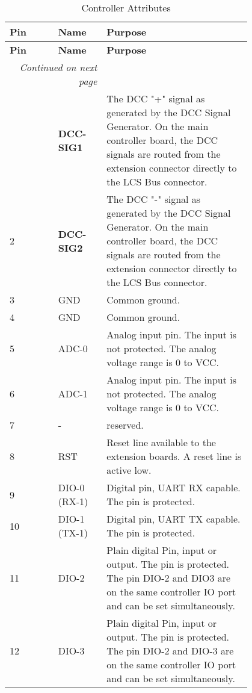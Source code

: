 \begin{longtable}{@{}|l|p{0.2\linewidth}p{0.6\linewidth}@{}}
    \caption{Controller Attributes} \\
    \toprule
    \textbf{Pin} & \textbf{Name} & \textbf{Purpose}\\
    \midrule
    \endfirsthead
    \toprule
    \textbf{Pin} & \textbf{Name} & \textbf{Purpose}\\
    \midrule
    \endhead
    \midrule
    \multicolumn{2}{r}{\textit{Continued on next page}} \\
    \midrule
    \endfoot
    \bottomrule
    \endlastfoot
    1 & \textbf{DCC-SIG1} & The DCC "+" signal as generated by the DCC Signal Generator. On the main controller board, the DCC signals are routed from the extension connector directly to the LCS Bus connector. \\
    \midrule
    2 & \textbf{DCC-SIG2} & The DCC "-" signal as generated by the DCC Signal Generator. On the main controller board, the DCC signals are routed from the extension connector directly to the LCS Bus connector. \\
    \midrule
    3 & GND & Common ground. \\
    \midrule
    4 & GND & Common ground. \\
    \midrule
    5 & ADC-0 & Analog input pin. The input is not protected. The analog voltage range is 0 to VCC. \\
    \midrule
    6 & ADC-1 & Analog input pin. The input is not protected. The analog voltage range is 0 to VCC. \\
    \midrule
    7 & - & reserved. \\
    \midrule
    8 & RST & Reset line available to the extension boards. A reset line is active low. \\
    \midrule
    9 & DIO-0 (RX-1) & Digital pin, UART RX capable. The pin is protected. \\
    \midrule
    10 & DIO-1 (TX-1) & Digital pin, UART TX capable. The pin is protected. \\
    \midrule
    11 & DIO-2 & Plain digital Pin, input or output. The pin is protected. The pin DIO-2 and DIO3 are on the same controller IO port and can be set simultaneously. \\
    \midrule
    12 & DIO-3 & Plain digital Pin, input or output. The pin is protected. The pin DIO-2 and DIO-3 are on the same controller IO port and can be set simultaneously. \\

\end{longtable}
